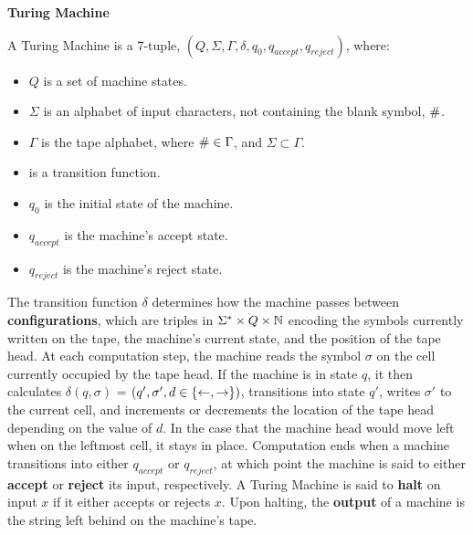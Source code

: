 \begin{definition}{\textbf{Turing Machine}}

  A Turing Machine is a 7-tuple, $(Q, \Sigma, \Gamma, \delta, q_0, q_{accept}, q_{reject})$, where:

  \begin{itemize}
  \item $Q$ is a set of machine states.
  \item $\Sigma$ is an alphabet of input characters, not containing
    the blank symbol, $\#$.
  \item $\Gamma$ is the tape alphabet, where $\# \in \Gamma$, and
    $\Sigma \subset \Gamma$.
  \item {} is a transition function.
  \item $q_0$ is the initial state of the machine.
  \item $q_{accept}$ is the machine's accept state.
  \item $q_{reject}$ is the machine's reject state.
  \end{itemize}

  The transition function $\delta$ determines how the machine passes
  between \textbf{configurations}, which are triples in $\Sigma^*
  \times Q \times \mathbb{N}$ encoding the symbols currently written on
  the tape, the machine's current state, and the position of the tape
  head.  At each computation step, the machine reads the symbol
  $\sigma$ on the cell currently occupied by the tape head.  If the
  machine is in state $q$, it then calculates $\delta(q, \sigma)$ =
  $(q', \sigma', d \in \{\leftarrow, \rightarrow\})$, transitions
  into state $q'$, writes $\sigma'$ to the current cell, and
  increments or decrements the location of the tape head depending on
  the value of $d$.  In the case that the machine head would move left
  when on the leftmost cell, it stays in place.  Computation ends when
  a machine transitions into either $q_{accept}$ or $q_{reject}$, at
  which point the machine is said to either \textbf{accept} or
  \textbf{reject} its input, respectively.  A Turing Machine is said
  to \textbf{halt} on input $x$ if it either accepts or rejects $x$.
  Upon halting, the \textbf{output} of a machine is the string left
  behind on the machine's tape.
  
\end{definition}

